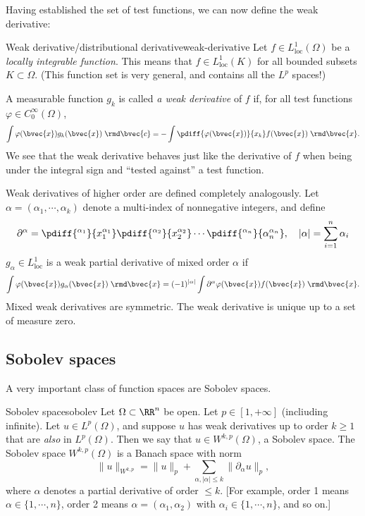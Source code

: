 
Having established the set of test functions, we can now define the weak derivative:
\begin{myDefinition}{Weak derivative/distributional derivative}{weak-derivative}
Let $f \in L^1_\text{loc}(\Omega)$ be a \emph{locally integrable function}. This means that $f \in L^1_\text{loc}(K)$ for all bounded subsets $K \subset \Omega$. (This function set is very general, and contains all the $L^p$ spaces!)

A measurable function $g_k$ is called \emph{a weak derivative} of $f$ if, for all test functions $\varphi\in C^\infty_0(\Omega)$,
\begin{equation}
    \int \varphi(\bvec{x}) g_k(\bvec{x}) \; \rmd \bvec{c} = - \int \pdiff{\varphi(\bvec{x})}{x_k} f(\bvec{x}) \; \rmd \bvec{x}.
\end{equation}
We see that the weak derivative behaves just like the derivative of $f$ when being under the integral sign and ``tested against'' a test function.

Weak derivatives of higher order are defined completely analogously. 
Let $\alpha = (\alpha_1,\cdots,\alpha_k)$ denote a multi-index of nonnegative integers, and define 
\begin{equation}
    \partial^\alpha = \pdiff{^{\alpha_1}}{x_1^{\alpha_1}}\pdiff{^{\alpha_2}}{x_2^{\alpha_2}}\cdots\pdiff{^{\alpha_n}}{\alpha_n^{\alpha_n}}, \quad |\alpha| = \sum_{i=1}^n \alpha_i
\end{equation}
$g_\alpha \in L^1_\text{loc}$ is a weak partial derivative of mixed order $\alpha$ if
\begin{equation}
    \int \varphi(\bvec{x}) g_\alpha(\bvec{x}) \; \rmd \bvec{x} = (-1)^{|\alpha|} \int \partial^\alpha{\varphi(\bvec{x})} f(\bvec{x}) \; \rmd \bvec{x}.
\end{equation}
Mixed weak derivatives are symmetric. The weak derivative is unique up to a set of measure zero.

\end{myDefinition}

\subsection{Sobolev spaces}

A very important class of function spaces are Sobolev spaces.
\begin{myDefinition}{Sobolev space}{sobolev}
    Let $\Omega \subset \RR^n$ be open. Let $p \in [1,+\infty]$ (incliuding infinite).
    Let $u \in L^p(\Omega)$, and suppose $u$ has weak derivatives up to order $k \geq 1$ that are \emph{also} in $L^p(\Omega)$. Then we say that $u \in W^{k,p}(\Omega)$, a Sobolev space. The Sobolev space $W^{k,p}(\Omega)$ is a Banach space with norm
    \begin{equation}
    \|u\|_{W^{k,p}} = \|u\|_p + \sum_{\alpha, |\alpha|\leq k} \|\partial_\alpha u\|_p,
    \end{equation}
    where $\alpha$ denotes a partial derivative of order $\leq k$. [For example, order 1 means $\alpha\in\{1,\cdots,n\}$, order 2 means $\alpha = (\alpha_1,\alpha_2)$ with $\alpha_i \in \{1,\cdots,n\}$, and so on.]
\end{myDefinition}

